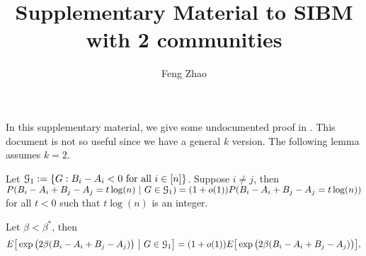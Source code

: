 \documentclass{article}
\title{Supplementary Material to SIBM with 2 communities}
\author{Feng Zhao}
\begin{document}
\maketitle
In this supplementary material, we give some undocumented proof in \cite{ye2020exact}.
This document is not so useful since we have a general $k$ version. The following lemma assumes $k=2$.
\begin{lemma}\label{lem:ucBA}
Let $\mathcal{G}_1:=\{G:B_i-A_i<0\text{~for all~}i\in[n]\}$. Suppose $i\neq j$, then $P(B_i-A_i + B_j - A_j= t\log(n)~|~G\in\mathcal{G}_1)= (1+o(1))P(B_i-A_i + B_j - A_j= t\log(n))$ for all $t<0$ such that $t\log(n)$ is an integer.
\end{lemma}
\begin{lemma}\label{lem:BijG}
	Let $\beta < \beta^*$,
then \begin{equation} 
E \big[  \exp\big(2\beta (B_i-A_i + B_j - A_j) \big) ~\big|~ G\in\mathcal{G}_1 \big] 
= (1+o(1)) E \big[  \exp\big(2\beta (B_i-A_i + B_j - A_j) \big) \big] ,
\end{equation}
\end{lemma}
\end{document}
